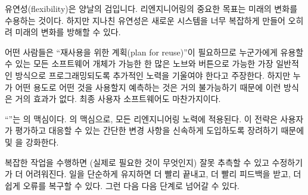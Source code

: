 \documentclass[a4paper,10pt,twoside]{book}
\begin{document}
유연성(flexibility)은 양날의 검입니다. 리엔지니어링의 중요한 목표는 미래의 변화를 수용하는 것이다. 하지만 지나친 유연성은 새로운 시스템을 너무 복잡하게 만들어 오히려 미래의 변화를 방해할 수 있다.

어떤 사람들은 ``재사용을 위한 계획(plan for reuse)''이 필요하므로 누군가에게 유용할 수 있는 모든 소프트웨어 개체가 가능한 한 많은 노브와 버튼으로 가능한 가장 일반적인 방식으로 프로그래밍되도록 추가적인 노력을 기울여야 한다고 주장한다. 하지만 누가 어떤 용도로 어떤 것을 사용할지 예측하는 것은 거의 불가능하기 때문에 이런 방식은 거의 효과가 없다. 최종 사용자 소프트웨어도 마찬가지이다.

``''는 의 맥심이다. \cite{Beck00a}의 맥심으로, 모든 리엔지니어링 노력에 적용된다. 이 전략은 사용자가 평가하고 대응할 수 있는 간단한 변경 사항을 신속하게 도입하도록 장려하기 때문에  및 을 강화한다.

복잡한 작업을 수행하면 (실제로 필요한 것이 무엇인지) 잘못 추측할 수 있고 수정하기가 더 어려워진다. 일을 단순하게 유지하면 더 빨리 끝내고, 더 빨리 피드백을 받고, 더 쉽게 오류를 복구할 수 있다. 그런 다음 다음 단계로 넘어갈 수 있다.

\ifx\wholebook\relax\else
   
   
   
\end{document}
